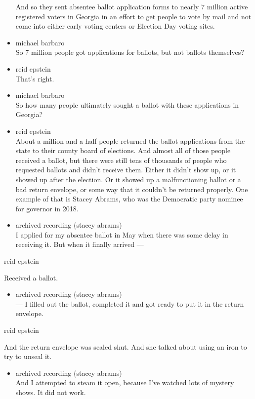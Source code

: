 \begin{itemize}
  And so they sent absentee ballot application forms to nearly 7 million
  active registered voters in Georgia in an effort to get people to vote
  by mail and not come into either early voting centers or Election Day
  voting sites.
\item
  michael barbaro\\
  So 7 million people got applications for ballots, but not ballots
  themselves?
\item
  reid epstein\\
  That's right.
\item
  michael barbaro\\
  So how many people ultimately sought a ballot with these applications
  in Georgia?
\item
  reid epstein\\
  About a million and a half people returned the ballot applications
  from the state to their county board of elections. And almost all of
  those people received a ballot, but there were still tens of thousands
  of people who requested ballots and didn't receive them. Either it
  didn't show up, or it showed up after the election. Or it showed up a
  malfunctioning ballot or a bad return envelope, or some way that it
  couldn't be returned properly. One example of that is Stacey Abrams,
  who was the Democratic party nominee for governor in 2018.
\item
  archived recording (stacey abrams)\\
  I applied for my absentee ballot in May when there was some delay in
  receiving it. But when it finally arrived ---
\end{itemize}

reid epstein

Received a ballot.

\begin{itemize}
\tightlist
\item
  archived recording (stacey abrams)\\
  --- I filled out the ballot, completed it and got ready to put it in
  the return envelope.
\end{itemize}

reid epstein

And the return envelope was sealed shut. And she talked about using an
iron to try to unseal it.

\begin{itemize}
\tightlist
\item
  archived recording (stacey abrams)\\
  And I attempted to steam it open, because I've watched lots of mystery
  shows. It did not work.
\end{itemize}

